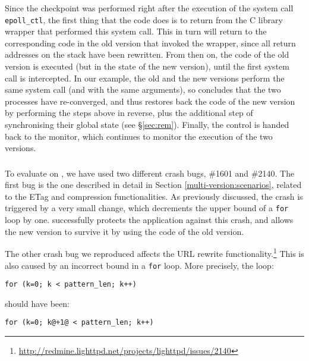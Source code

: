 Since the checkpoint was performed right after the execution of the system
call \lstinline`epoll_ctl`, the first thing that the code does is to
return from the C library wrapper that performed this system
call.  This in turn will return to the corresponding code in the old
version that invoked the wrapper, since all return addresses on the
stack have been rewritten.  From then on, the code of the old version
is executed (but in the state of the new version), until the first
system call is intercepted.  In our example, the old and the new
versions perform the same system call (and with the same arguments),
so \rem concludes that the two processes have re-converged, and thus
restores back the code of the new version by performing the steps
above in reverse, plus the additional step of synchronising their
global state (see \S\ref{sec:rem}).  Finally, the control is handed
back to the \mxm monitor, which continues to monitor the execution of
the two versions.

\subsubsection{\lighttpd}
\label{sec:lighttpd}

To evaluate \mx on \lighttpd, we have used two different crash bugs, \#1601 and
\#2140.  The first bug is the one described in detail in Section
\ref{multi-version:scenarios}, related to the ETag and compression
functionalities.  As previously discussed, the crash is triggered by a very
small change, which decrements the upper bound of a \lstinline`for` loop by one.
\mx successfully protects the application against this crash, and allows the
new version to survive it by using the code of the old version.

The other crash bug we reproduced affects the URL rewrite
functionality.\footnote{\url{http://redmine.lighttpd.net/projects/lighttpd/issues/2140}}
This is also caused by an incorrect bound in a \lstinline`for` loop.
More precisely, the loop: 

\begin{lstlisting}[numbers=none,breaklines=true,xleftmargin=0pt]
for (k=0; k < pattern_len; k++)
\end{lstlisting}

\noindent should have been:

\begin{lstlisting}[numbers=none,breaklines=true,xleftmargin=0pt]
for (k=0; k@+1@ < pattern_len; k++)
\end{lstlisting}


